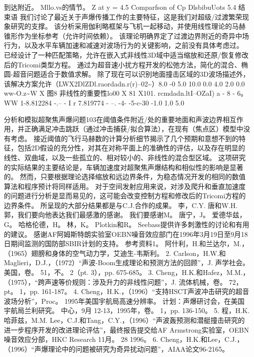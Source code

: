 \documentclass[UTF8,11pt,a4paper,openany,fontset=fandol]{ctexbook}
\begin{document}
到达附近。 Mllo.vs的情节。 Z at y = 4.5 Comparfson of Cp DlsbibuUots 5.4 结束语 我们讨论了最近关于声爆传播工作的主要特征，这是我们对超级/过渡繁荣现象研究的支撑。 该分析采用伽利略框架与飞机一起移动，并使用线性理论的马赫锥形作为坐标参考（允许时间依赖）。 该理论明确界定了过渡边界附近的奇异中场行为，以及水平车辆加速和减速对波场行为的关键影响，之前没有具体考虑过。 已经设计了一种匹配策略，允许在嵌入式非线性3D域中适当缩放和还原/恢复修改后的Tricomi类型方程。 通过为超音速小扰方程开发的松弛方法，简化的混合、椭圆-超音问题适合于数值求解。 除了现在可以识别地面撞击区域的3D波场描述外，该解决方案允许（LWX2DlZDl.raordadn.r(r)--02\textasciitilde{}）8.0 -0 5.0 10.0 0.0 4.0 2.0 0.0 ww-O.z\textasciitilde{}W X 图8 非线性的重要性lo00 X 81 X101. rcmdadn.ltI--OZaI) a - 8 - 6。 WW 1-8.812284 -.-- - I r 7.819774 - --. -4- -5-c-30 -1.0 1.0 5.0

分析和模拟超聚焦声爆问题103在阈值条件附近/处的重要地面和声波边界相互作用，并正确满足冲击跳跃（通过冲击捕获/拟合算法），在现有（焦点区）模型中没有考虑。 接近阈值的飞行马赫数的计算分析细节揭示了几个预期和意想不到的特征，包括2D假设的充分性，对其在对称平面上的准确性的评估，以及存在明显的线性、双曲域，以及一些孤立的、相对较小的、非线性的混合型区域。 这项研究的实际结果的主要结论是，车辆加速度对超聚焦声爆结构和相似性的影响是显著的。 然而，只要根据理论选择缩放和远边界条件，为稳态情况开发的相同的数值算法和程序预计将同样适用。 对于空间发射应用来说，对涉及爬升和垂直加速度的问题进行分析是显而易见的，这可能会改变控制方程和修改后的Tricomi方程的边界条件。 所呈现的大部分结果都是与C.J.合作的成果。 李，C.Y. 唐和W.H. 郭，我们要向他表达我们最感激的感谢。 我们要感谢M。 唐宁，J。 爱德华兹，G。 哈格伦德，H。 林，K。 Plotkin和R。 Seebass提供许多刺激性的讨论和有用的建议。 感谢AF阿姆斯特朗实验室OEBN噪音效应部门在1996年3月19日至9月18日期间监测的国防部SBIR计划的支持。 参考资料1。 阿什利，H.和兰达尔，M.，（1965）翅膀和身体的空气动力学，艾迪生-韦斯利。 2. Carlson，H.W.和Maglieri，D.J.，（1972）“声波-Boom生成理论和预测方法的回顾”，J. 声学社会。 美国，卷。 51，不。 2（pt. 3），pp. 675-685。 3. Cheng，H.K.和Hafez，M.M.，（1975），“跨声速等价规则：涉及升力的非线性问题”，J. 流体机械，卷。 72，pt。 1，pp. 161-187。 4. Cheng，H.K.，（1996）“支持HSCT声波冲击研究的超音波场分析”，Proc。 1995年美国宇航局高速分辨率。 计划：声爆研讨会，在美国宇航局兰利研究。 中心，9月 12-13，1995年，卷。 1，pp. 136-150。 5. 程，H.K. 哈菲兹，M.M. Lee，C.J.和Tang，C.Y.，（1996）“声波轰预测和潜艇撞击研究的进一步程序开发的改进理论评估”，最终报告提交给AF Armstrong实验室，OEBN噪音效应分部，HKC Research 11月。 28 1996。 6. Cheng，H.K.和Lee，C.J.，（1996）“声爆理论中的问题被研究为奇异扰动问题”，AIAA论文96-2165。
\end{document}
